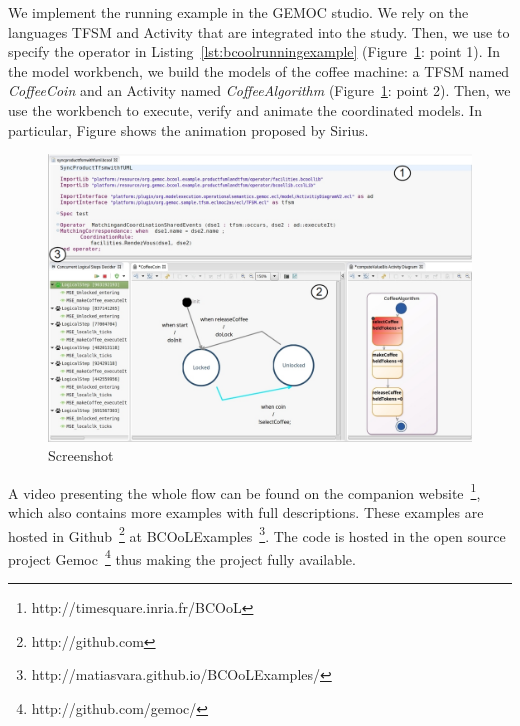We implement the running example in the GEMOC studio. We rely on the languages TFSM and Activity that are integrated into the study. Then, we use \bcool to specify the operator in Listing~\ref{lst:bcoolrunningexample} (Figure~\ref{fig:screenbcool}: point 1). In the model workbench, we build the models of the coffee machine: a TFSM named \emph{CoffeeCoin} and an Activity named \emph{CoffeeAlgorithm} (Figure~\ref{fig:screenbcool}: point 2). Then, we use the workbench to execute, verify and animate the coordinated models. In particular, Figure shows the animation proposed by Sirius.   

\begin{figure}[h]
	\begin{center}
		\includegraphics[width=.6\textwidth]{bcool/figs/bcoolscreen.png}
		\caption{Screenshot}
		\label{fig:screenbcool}
	\end{center}
\end{figure}

A video presenting the whole flow can be found on the companion website~\footnote{http://timesquare.inria.fr/BCOoL}, which also contains more examples with full descriptions. These examples are hosted in Github~\footnote{http://github.com} at BCOoLExamples~\footnote{http://matiasvara.github.io/BCOoLExamples/}. The \bcool code is hosted in the open source project Gemoc~\footnote{http://github.com/gemoc/} thus making the project fully available.

  

